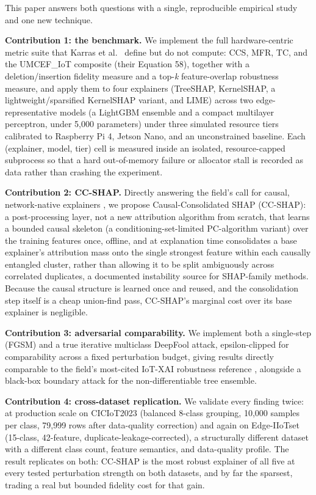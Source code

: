 This paper answers both questions with a single, reproducible empirical study and one new technique.

\textbf{Contribution 1: the benchmark.} We implement the full hardware-centric metric suite that Karras et al.~\citep{ref1} define but do not compute: CCS, MFR, TC, and the UMCEF\_IoT composite (their Equation 58), together with a deletion/insertion fidelity measure and a top-\emph{k} feature-overlap robustness measure, and apply them to four explainers (TreeSHAP, KernelSHAP, a lightweight/sparsified KernelSHAP variant, and LIME) across two edge-representative models (a LightGBM ensemble and a compact multilayer perceptron, under 5,000 parameters) under three simulated resource tiers calibrated to Raspberry Pi 4, Jetson Nano, and an unconstrained baseline. Each (explainer, model, tier) cell is measured inside an isolated, resource-capped subprocess so that a hard out-of-memory failure or allocator stall is recorded as data rather than crashing the experiment.

\textbf{Contribution 2: CC-SHAP.} Directly answering the field's call for causal, network-native explainers \citep{ref1,ref7}, we propose Causal-Consolidated SHAP (CC-SHAP): a post-processing layer, not a new attribution algorithm from scratch, that learns a bounded causal skeleton (a conditioning-set-limited PC-algorithm variant) over the training features once, offline, and at explanation time consolidates a base explainer's attribution mass onto the single strongest feature within each causally entangled cluster, rather than allowing it to be split ambiguously across correlated duplicates, a documented instability source for SHAP-family methods. Because the causal structure is learned once and reused, and the consolidation step itself is a cheap union-find pass, CC-SHAP's marginal cost over its base explainer is negligible.

\textbf{Contribution 3: adversarial comparability.} We implement both a single-step (FGSM) and a true iterative multiclass DeepFool attack, epsilon-clipped for comparability across a fixed perturbation budget, giving results directly comparable to the field's most-cited IoT-XAI robustness reference \citep{ref8}, alongside a black-box boundary attack for the non-differentiable tree ensemble.

\textbf{Contribution 4: cross-dataset replication.} We validate every finding twice: at production scale on CICIoT2023 \citep{ref9} (balanced 8-class grouping, 10,000 samples per class, 79,999 rows after data-quality correction) and again on Edge-IIoTset \citep{ref10} (15-class, 42-feature, duplicate-leakage-corrected), a structurally different dataset with a different class count, feature semantics, and data-quality profile. The result replicates on both: CC-SHAP is the most robust explainer of all five at every tested perturbation strength on both datasets, and by far the sparsest, trading a real but bounded fidelity cost for that gain.

